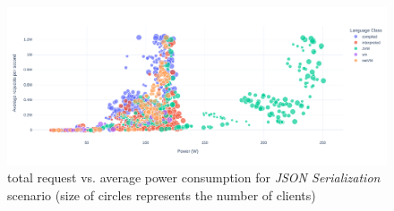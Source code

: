 \begin{figure}[!h]
    \centering
    \includegraphics[width=\textwidth,height=\textheight,keepaspectratio]{imgs/power_requests_json}
    \caption{total request vs. average power consumption for \emph{JSON Serialization} scenario (size of circles represents the number of clients)}
    \label{fig:power_requests_json}
\end{figure}

